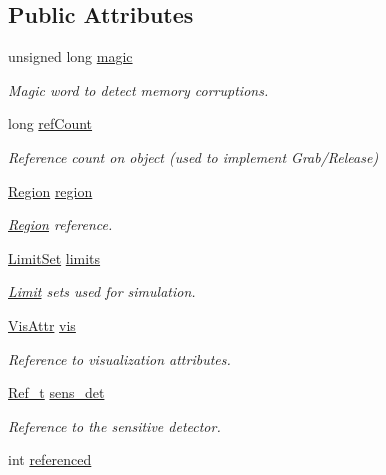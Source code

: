 \subsection*{Public Attributes}
\begin{DoxyCompactItemize}
\item 
unsigned long \hyperlink{class_d_d4hep_1_1_geometry_1_1_volume_extension_ac2ad71bb6a554c749f06c8cce9a8fe8a}{magic}
\begin{DoxyCompactList}\small\item\em Magic word to detect memory corruptions. \end{DoxyCompactList}\item 
long \hyperlink{class_d_d4hep_1_1_geometry_1_1_volume_extension_a604559432eb0145b52013c5105a2566b}{ref\+Count}
\begin{DoxyCompactList}\small\item\em Reference count on object (used to implement Grab/\+Release) \end{DoxyCompactList}\item 
\hyperlink{class_d_d4hep_1_1_geometry_1_1_region}{Region} \hyperlink{class_d_d4hep_1_1_geometry_1_1_volume_extension_ac4303caba2a748fd25e8c986c8001096}{region}
\begin{DoxyCompactList}\small\item\em \hyperlink{class_d_d4hep_1_1_geometry_1_1_region}{Region} reference. \end{DoxyCompactList}\item 
\hyperlink{class_d_d4hep_1_1_geometry_1_1_limit_set}{Limit\+Set} \hyperlink{class_d_d4hep_1_1_geometry_1_1_volume_extension_a2197ef0277ad4fdebc1a285ec311d019}{limits}
\begin{DoxyCompactList}\small\item\em \hyperlink{class_d_d4hep_1_1_geometry_1_1_limit}{Limit} sets used for simulation. \end{DoxyCompactList}\item 
\hyperlink{class_d_d4hep_1_1_geometry_1_1_vis_attr}{Vis\+Attr} \hyperlink{class_d_d4hep_1_1_geometry_1_1_volume_extension_ae4a19cb963f258f84a6fa871e8b6f4c1}{vis}
\begin{DoxyCompactList}\small\item\em Reference to visualization attributes. \end{DoxyCompactList}\item 
\hyperlink{group___d_d4_h_e_p___g_e_o_m_e_t_r_y_ga40af83be6718bb8828a3d83dc7f8c930}{Ref\+\_\+t} \hyperlink{class_d_d4hep_1_1_geometry_1_1_volume_extension_a3b0ac7f31e5c962f0eb479c24d4c72ea}{sens\+\_\+det}
\begin{DoxyCompactList}\small\item\em Reference to the sensitive detector. \end{DoxyCompactList}\item 
int \hyperlink{class_d_d4hep_1_1_geometry_1_1_volume_extension_aa73b0b45a2b7112a60e9616da6edcde4}{referenced}
\end{DoxyCompactItemize}


